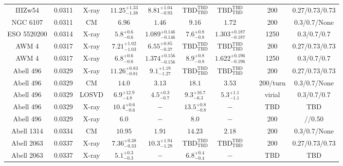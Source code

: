 \begin{table}
\begin{tabular}{cccccccccc}
IIIZw54 & 0.0311 & X-ray & ${11.25}^{+1.33}_{-1.38}$ & ${8.81}^{+1.04}_{-0.93}$ & ${\mathrm{TBD}}^{\mathrm{TBD}}_{\mathrm{TBD}}$ & ${\mathrm{TBD}}^{\mathrm{TBD}}_{\mathrm{TBD}}$ & \citet{BA14.1} & 200 & 0.27/0.73/0.73 \\
NGC 6107 & 0.0311 & CM & ${6.96}^{}_{}$ & ${1.46}^{}_{}$ & ${9.16}^{}_{}$ & ${1.72}^{}_{}$ & \citet{RI06.1} & 200 & 0.3/0.7/None \\
ESO 5520200 & 0.0314 & X-ray & ${5.8}^{+0.6}_{-0.6}$ & ${1.089}^{+0.146}_{-0.146}$ & ${7.6}^{+0.8}_{-0.8}$ & ${1.303}^{+0.187}_{-0.187}$ & \citet{GA06.1} & 1250 & 0.3/0.7/0.7 \\
AWM 4 & 0.0317 & X-ray & ${7.21}^{+1.02}_{-1.03}$ & ${6.55}^{+0.85}_{-0.37}$ & ${\mathrm{TBD}}^{\mathrm{TBD}}_{\mathrm{TBD}}$ & ${\mathrm{TBD}}^{\mathrm{TBD}}_{\mathrm{TBD}}$ & \citet{BA14.1} & 200 & 0.27/0.73/0.73 \\
AWM 4 & 0.0317 & X-ray & ${6.8}^{+0.6}_{-0.6}$ & ${1.374}^{+0.156}_{-0.156}$ & ${8.9}^{+0.8}_{-0.8}$ & ${1.622}^{+0.196}_{-0.196}$ & \citet{GA06.1} & 1250 & 0.3/0.7/0.7 \\
Abell 496 & 0.0329 & X-ray & ${11.26}^{+0.83}_{-0.81}$ & ${9.1}^{+1.19}_{-1.27}$ & ${\mathrm{TBD}}^{\mathrm{TBD}}_{\mathrm{TBD}}$ & ${\mathrm{TBD}}^{\mathrm{TBD}}_{\mathrm{TBD}}$ & \citet{BA14.1} & 200 & 0.27/0.73/0.73 \\
Abell 496 & 0.0329 & CM & ${14.0}^{}_{}$ & ${3.13}^{}_{}$ & ${18.1}^{}_{}$ & ${3.53}^{}_{}$ & \citet{RI03.1} & 200/turn & 0.3/0.7/None \\
Abell 496 & 0.0329 & LOSVD & ${6.9}^{+12.9}_{-4.8}$ & ${4.5}^{+0.3}_{-0.7}$ & ${9.3}^{+16.7}_{-6.3}$ & ${5.3}^{+1.1}_{-1.1}$ & \citet{LO06.1} & virial & 0.3/0.7/0.7 \\
Abell 496 & 0.0329 & X-ray & ${10.4}^{+0.6}_{-0.6}$ & ${-}^{}_{}$ & ${13.5}^{+0.8}_{-0.8}$ & ${-}^{}_{}$ & \citet{XU01.1} & TBD & TBD \\
Abell 496 & 0.0329 & X-ray & ${6.0}^{}_{}$ & ${-}^{}_{}$ & ${8.0}^{}_{}$ & ${-}^{}_{}$ & \citet{MA99.1} & 200 & //0.50 \\
Abell 1314 & 0.0334 & CM & ${10.95}^{}_{}$ & ${1.91}^{}_{}$ & ${14.23}^{}_{}$ & ${2.18}^{}_{}$ & \citet{RI06.1} & 200 & 0.3/0.7/None \\
Abell 2063 & 0.0337 & X-ray & ${7.36}^{+0.38}_{-0.33}$ & ${10.3}^{+1.94}_{-1.29}$ & ${\mathrm{TBD}}^{\mathrm{TBD}}_{\mathrm{TBD}}$ & ${\mathrm{TBD}}^{\mathrm{TBD}}_{\mathrm{TBD}}$ & \citet{BA14.1} & 200 & 0.27/0.73/0.73 \\
Abell 2063 & 0.0337 & X-ray & ${5.1}^{+0.3}_{-0.3}$ & ${-}^{}_{}$ & ${6.8}^{+0.4}_{-0.4}$ & ${-}^{}_{}$ & \citet{XU01.1} & TBD & TBD \\

\end{tabular}
\end{table}
